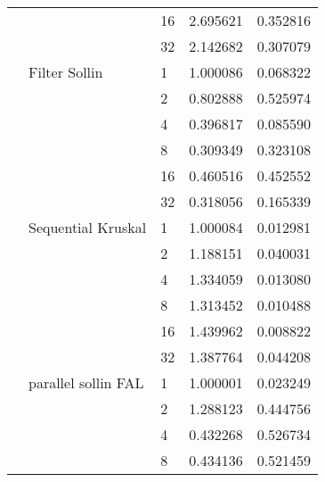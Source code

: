 \begin{tabular}{lllrr}
                                                       &                     & 16 &  2.695621 &  0.352816 \\
                                                       &                     & 32 &  2.142682 &  0.307079 \\
                                                       & Filter Sollin & 1  &  1.000086 &  0.068322 \\
                                                       &                     & 2  &  0.802888 &  0.525974 \\
                                                       &                     & 4  &  0.396817 &  0.085590 \\
                                                       &                     & 8  &  0.309349 &  0.323108 \\
                                                       &                     & 16 &  0.460516 &  0.452552 \\
                                                       &                     & 32 &  0.318056 &  0.165339 \\
                                                       & Sequential Kruskal & 1  &  1.000084 &  0.012981 \\
                                                       &                     & 2  &  1.188151 &  0.040031 \\
                                                       &                     & 4  &  1.334059 &  0.013080 \\
                                                       &                     & 8  &  1.313452 &  0.010488 \\
                                                       &                     & 16 &  1.439962 &  0.008822 \\
                                                       &                     & 32 &  1.387764 &  0.044208 \\
                                                       & parallel sollin FAL & 1  &  1.000001 &  0.023249 \\
                                                       &                     & 2  &  1.288123 &  0.444756 \\
                                                       &                     & 4  &  0.432268 &  0.526734 \\
                                                       &                     & 8  &  0.434136 &  0.521459 \\

\end{tabular}
